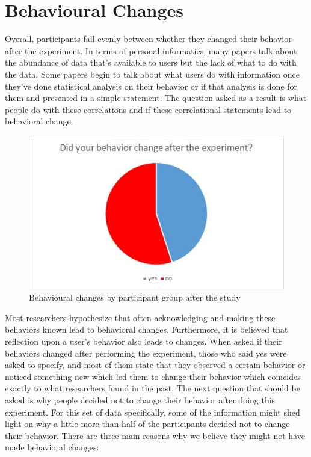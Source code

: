 \section{Behavioural Changes}
Overall, participants fall evenly between whether they changed their behavior after the experiment. In terms of personal informatics, many papers talk about the abundance of data that’s available to users but the lack of what to do with the data. Some papers begin to talk about what users do with information once they’ve done statistical analysis on their behavior or if that analysis is done for them and presented in a simple statement. The question asked as a result is what people do with these correlations and if these correlational statements lead to behavioral change. 

\begin{figure}[!t]\centering
\includegraphics[width=1.0\columnwidth]{images/behavior_change.jpg}
\caption{\footnotesize Behavioural changes by participant group after the study \label{fig:behaviorchange} 
}
\end{figure}

    Most researchers hypothesize that often acknowledging and making these behaviors known lead to behavioral changes. Furthermore, it is believed that reflection upon a user's behavior also leads to changes. When asked if their behaviors changed after performing the experiment, those who said yes were asked to specify, and most of them state that they observed a certain behavior or noticed something new which led them to change their behavior which coincides exactly to what researchers found in the past. 
    The next question that should be asked is why people decided not to change their behavior after doing this experiment. For this set of data specifically, some of the information might shed light on why a little more than half of the participants decided not to change their behavior. There are three main reasons why we believe they might not have made behavioral changes:
